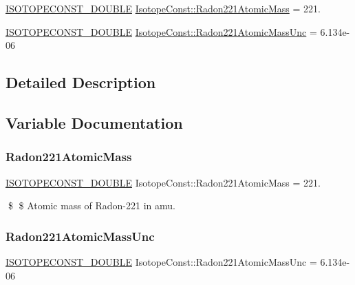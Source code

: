 \begin{DoxyCompactItemize}
\item 
\mbox{\hyperlink{group___isotope_const-_macros_ga8f45a7272ce02c0b4c65c44636ed719a}{I\+S\+O\+T\+O\+P\+E\+C\+O\+N\+S\+T\+\_\+\+D\+O\+U\+B\+LE}} \mbox{\hyperlink{group___isotope_const-_radon-_rn221_gadb091ab51a0993465e6e785fe9dab38b}{Isotope\+Const\+::\+Radon221\+Atomic\+Mass}} = 221.
\item 
\mbox{\hyperlink{group___isotope_const-_macros_ga8f45a7272ce02c0b4c65c44636ed719a}{I\+S\+O\+T\+O\+P\+E\+C\+O\+N\+S\+T\+\_\+\+D\+O\+U\+B\+LE}} \mbox{\hyperlink{group___isotope_const-_radon-_rn221_ga822923a6368614c34f55f9852cf9ce86}{Isotope\+Const\+::\+Radon221\+Atomic\+Mass\+Unc}} = 6.\+134e-\/06
\end{DoxyCompactItemize}


\subsection{Detailed Description}


\subsection{Variable Documentation}
\mbox{\label{group___isotope_const-_radon-_rn221_gadb091ab51a0993465e6e785fe9dab38b}} 
\subsubsection{\texorpdfstring{Radon221\+Atomic\+Mass}{Radon221AtomicMass}}
{\footnotesize\ttfamily \mbox{\hyperlink{group___isotope_const-_macros_ga8f45a7272ce02c0b4c65c44636ed719a}{I\+S\+O\+T\+O\+P\+E\+C\+O\+N\+S\+T\+\_\+\+D\+O\+U\+B\+LE}} Isotope\+Const\+::\+Radon221\+Atomic\+Mass = 221.}

\$ \$ Atomic mass of Radon-\/221 in amu. \mbox{\label{group___isotope_const-_radon-_rn221_ga822923a6368614c34f55f9852cf9ce86}} 
\subsubsection{\texorpdfstring{Radon221\+Atomic\+Mass\+Unc}{Radon221AtomicMassUnc}}
{\footnotesize\ttfamily \mbox{\hyperlink{group___isotope_const-_macros_ga8f45a7272ce02c0b4c65c44636ed719a}{I\+S\+O\+T\+O\+P\+E\+C\+O\+N\+S\+T\+\_\+\+D\+O\+U\+B\+LE}} Isotope\+Const\+::\+Radon221\+Atomic\+Mass\+Unc = 6.\+134e-\/06}

